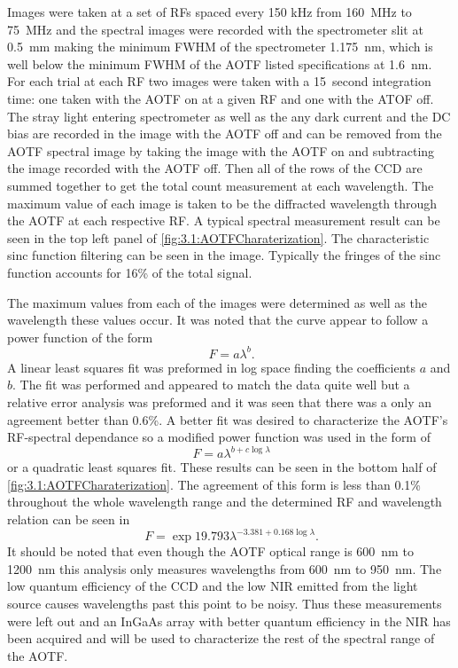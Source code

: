 \documentclass[12pt]{article}
\begin{document}
Images were taken at a set of RFs spaced every 150 kHz from 160~MHz to 75~MHz and the spectral images were recorded with the spectrometer slit at 0.5~mm making the minimum FWHM of the spectrometer 1.175~nm, which is well below the minimum FWHM of the AOTF listed specifications at 1.6~nm. For each trial at each RF two images were taken with a 15~second integration time: one taken with the AOTF on at a given RF and one with the ATOF off. The stray light entering spectrometer as well as the any dark current and the DC bias are recorded in the image with the AOTF off and can be removed from the AOTF spectral image by taking the image with the AOTF on and subtracting the image recorded with the AOTF off. Then all of the rows of the CCD are summed together to get the total count measurement at each wavelength. The maximum value of each image is taken to be the diffracted wavelength through the AOTF at each respective RF. A typical spectral measurement result can be seen in the top left panel of \autoref{fig:3.1:AOTFCharaterization}. The characteristic sinc function filtering can be seen in the image. Typically the fringes of the sinc function accounts for 16\% of the total signal.

The maximum values from each of the images were determined as well as the wavelength these values occur. It was noted that the curve appear to follow a power function of the form
\begin{equation}
    \ F = a\lambda^{b}.
    \label{eqn:3.1:powerFunction}
\end{equation}
A linear least squares fit was preformed in log space finding the coefficients $a$ and $b$. The fit was performed and appeared to match the data quite well but a relative error analysis was preformed and it was seen that there was a only an agreement better than 0.6\%. A better fit was desired to characterize the AOTF's RF-spectral dependance so a modified power function was used in the form of
 \begin{equation}
    \ F = a\lambda^{b+c\log\lambda}
    \label{eqn:3.1:modifiedPowerFunction}
\end{equation}
or a quadratic least squares fit. These results can be seen in the bottom half of \autoref{fig:3.1:AOTFCharaterization}. The agreement of this form is less than 0.1\% throughout the whole wavelength range and the determined RF and wavelength relation can be seen in
\begin{equation}
    \ F = \exp{19.793}\lambda^{-3.381+0.168\log\lambda}.
    \label{eqn:3.1:modifiedPowerFunctionCoeffiecicents}
\end{equation}
It should be noted that even though the AOTF optical range is 600~nm to 1200~nm this analysis only measures wavelengths from 600~nm to 950~nm. The low quantum efficiency of the CCD and the low NIR emitted from the light source causes wavelengths past this point to be noisy. Thus these measurements were left out and an InGaAs array with better quantum efficiency in the NIR has been acquired and will be used to characterize the rest of the spectral range of the AOTF.
\end{document}
